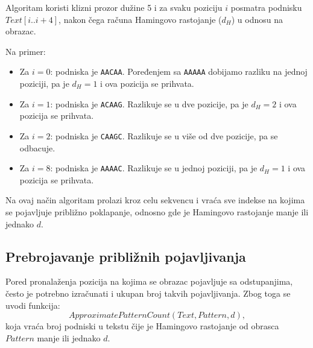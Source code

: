 \documentclass[12pt,oneside]{memoir}
\begin{document}
Algoritam koristi klizni prozor dužine 5 i za svaku poziciju $i$ posmatra podnisku $Text[i..i+4]$, nakon čega računa Hamingovo rastojanje ($d_H$) u odnosu na obrazac.

Na primer:

\begin{itemize}
    \item Za $i = 0$: podniska je \texttt{AACAA}.  
    Poređenjem sa \texttt{AAAAA} dobijamo razliku na jednoj poziciji, pa je $d_H = 1$ i ova pozicija se prihvata.

    \item Za $i = 1$: podniska je \texttt{ACAAG}.  
    Razlikuje se u dve pozicije, pa je $d_H = 2$ i ova pozicija se prihvata.

    \item Za $i = 2$: podniska je \texttt{CAAGC}.  
    Razlikuje se u više od dve pozicije, pa se odbacuje.

    \item Za $i = 8$: podniska je \texttt{AAAAC}.  
    Razlikuje se u jednoj poziciji, pa je $d_H = 1$ i ova pozicija se prihvata.
\end{itemize}

Na ovaj način algoritam prolazi kroz celu sekvencu i vraća sve indekse na kojima se pojavljuje približno poklapanje, odnosno gde je Hamingovo rastojanje manje ili jednako $d$.

\subsection{Prebrojavanje približnih pojavljivanja}

Pored pronalaženja pozicija na kojima se obrazac pojavljuje sa odstupanjima, često je potrebno izračunati i ukupan broj takvih pojavljivanja. Zbog toga se uvodi funkcija:
\[
ApproximatePatternCount(Text, Pattern, d),
\]
koja vraća broj podniski u tekstu čije je Hamingovo rastojanje od obrasca $Pattern$ manje ili jednako $d$.



\begin{algorithm}[h]
\caption{Approximate Pattern Count}
\label{alg:approximate_pattern_count}
\SetAlgoLined
\DontPrintSemicolon
{}
\end{algorithm}
\end{document}
